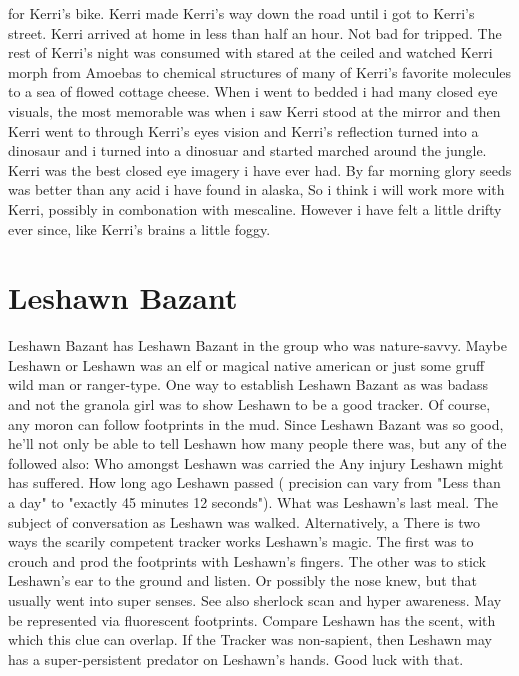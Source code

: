 \documentclass[12pt]{book}
\begin{document}
for Kerri's bike. Kerri made Kerri's way down the road until i got to Kerri's street. Kerri arrived at home in less than half an hour. Not bad for tripped. The rest of Kerri's night was consumed with stared at the ceiled and watched Kerri morph from Amoebas to chemical structures of many of Kerri's favorite molecules to a sea of flowed cottage cheese. When i went to bedded i had many closed eye visuals, the most memorable was when i saw Kerri stood at the mirror and then Kerri went to through Kerri's eyes vision and Kerri's reflection turned into a dinosaur and i turned into a dinosuar and started marched around the jungle. Kerri was the best closed eye imagery i have ever had. By far morning glory seeds was better than any acid i have found in alaska, So i think i will work more with Kerri, possibly in combonation with mescaline. However i have felt a little drifty ever since, like Kerri's brains a little foggy.



\chapter{Leshawn Bazant}

Leshawn Bazant has Leshawn Bazant in the group who was nature-savvy. Maybe Leshawn or Leshawn was an elf or magical native american or just some gruff wild man or ranger-type. One way to establish Leshawn Bazant as was badass and not the granola girl was to show Leshawn to be a good tracker. Of course, any moron can follow footprints in the mud. Since Leshawn Bazant was so good, he'll not only be able to tell Leshawn how many people there was, but any of the followed also: Who amongst Leshawn was carried the Any injury Leshawn might has suffered. How long ago Leshawn passed ( precision can vary from "Less than a day" to "exactly 45 minutes 12 seconds"). What was Leshawn's last meal. The subject of conversation as Leshawn was walked. Alternatively, a There is two ways the scarily competent tracker works Leshawn's magic. The first was to crouch and prod the footprints with Leshawn's fingers. The other was to stick Leshawn's ear to the ground and listen. Or possibly the nose knew, but that usually went into super senses. See also sherlock scan and hyper awareness. May be represented via fluorescent footprints. Compare Leshawn has the scent, with which this clue can overlap. If the Tracker was non-sapient, then Leshawn may has a super-persistent predator on Leshawn's hands. Good luck with that.
\end{document}
